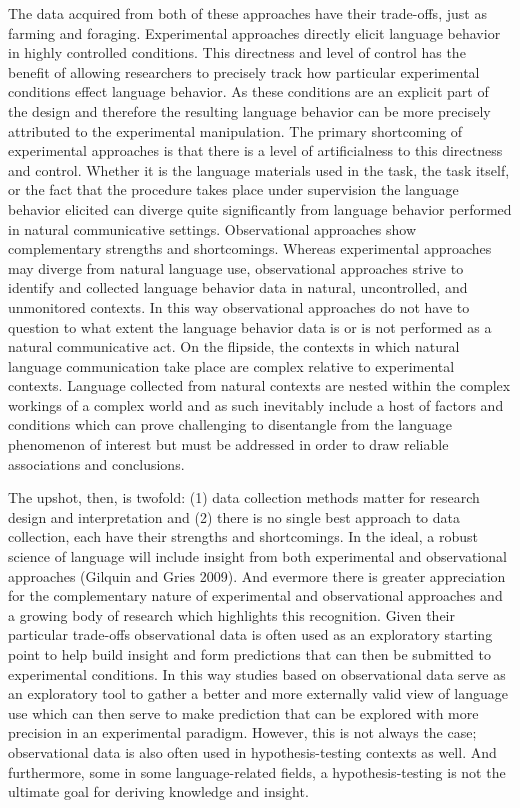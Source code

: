 \documentclass[
  letterpaper,
]{latex/krantz}
\begin{document}
The data acquired from both of these approaches have their trade-offs,
just as farming and foraging. Experimental approaches directly elicit
language behavior in highly controlled conditions. This directness and
level of control has the benefit of allowing researchers to precisely
track how particular experimental conditions effect language behavior.
As these conditions are an explicit part of the design and therefore the
resulting language behavior can be more precisely attributed to the
experimental manipulation. The primary shortcoming of experimental
approaches is that there is a level of artificialness to this directness
and control. Whether it is the language materials used in the task, the
task itself, or the fact that the procedure takes place under
supervision the language behavior elicited can diverge quite
significantly from language behavior performed in natural communicative
settings. Observational approaches show complementary strengths and
shortcomings. Whereas experimental approaches may diverge from natural
language use, observational approaches strive to identify and collected
language behavior data in natural, uncontrolled, and unmonitored
contexts. In this way observational approaches do not have to question
to what extent the language behavior data is or is not performed as a
natural communicative act. On the flipside, the contexts in which
natural language communication take place are complex relative to
experimental contexts. Language collected from natural contexts are
nested within the complex workings of a complex world and as such
inevitably include a host of factors and conditions which can prove
challenging to disentangle from the language phenomenon of interest but
must be addressed in order to draw reliable associations and
conclusions.

The upshot, then, is twofold: (1) data collection methods matter for
research design and interpretation and (2) there is no single best
approach to data collection, each have their strengths and shortcomings.
In the ideal, a robust science of language will include insight from
both experimental and observational approaches (Gilquin and Gries 2009).
And evermore there is greater appreciation for the complementary nature
of experimental and observational approaches and a growing body of
research which highlights this recognition. Given their particular
trade-offs observational data is often used as an exploratory starting
point to help build insight and form predictions that can then be
submitted to experimental conditions. In this way studies based on
observational data serve as an exploratory tool to gather a better and
more externally valid view of language use which can then serve to make
prediction that can be explored with more precision in an experimental
paradigm. However, this is not always the case; observational data is
also often used in hypothesis-testing contexts as well. And furthermore,
some in some language-related fields, a hypothesis-testing is not the
ultimate goal for deriving knowledge and insight.
\end{document}
